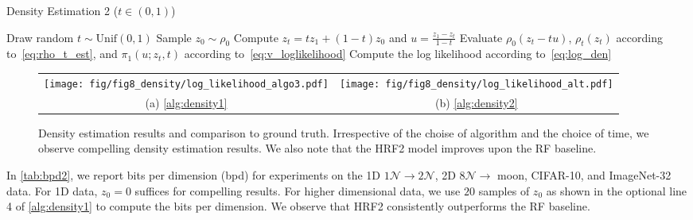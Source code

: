 \begin{algorithm}[t]
\caption{Density Estimation 2 ($t\in(0,1)$)}\label{alg:density2}

Draw random $t \sim \mathrm{Unif}(0, 1)$ \;
Sample  $z_0\sim \rho_0$ \;
Compute $z_t = t z_1 + (1-t) z_0$ and $u = \frac{z_1 - z_t}{1-t}$ \;
Evaluate $\rho_0(z_t - tu)$, $\rho_t(z_t)$ according to~\cref{eq:rho_t_est}, and $\pi_1(u; z_t, t)$ according to~\cref{eq:v_loglikelihood} \;
Compute the log likelihood according to~\cref{eq:log_den} \;
\end{algorithm}

\begin{figure}[t]
    \centering
    \setlength{\tabcolsep}{0pt}
    \begin{tabular}{cc}
    \texttt{[image: fig/fig8\_density/log\_likelihood\_algo3.pdf]}&
    \texttt{[image: fig/fig8\_density/log\_likelihood\_alt.pdf]}\\
    (a) \cref{alg:density1} & (b) \cref{alg:density2} 
    \end{tabular}
    \caption{Density estimation results and comparison to ground truth. Irrespective of the choise of algorithm and the choice of time, we observe compelling density estimation results. We also note that the HRF2 model improves upon the RF baseline.}
    \label{fig:density}
\end{figure}


In \cref{tab:bpd2}, we report bits per dimension (bpd) for experiments on the 1D $1\mathcal{N}\to2\mathcal{N}$, 2D $8\mathcal{N}\to$ moon, CIFAR-10, and ImageNet-32 data.  
For 1D data, $z_0=0$ suffices for compelling results. For higher dimensional data, we use $20$ samples of $z_0$ as shown in the optional line 4 of \cref{alg:density1} to compute the bits per dimension. 
We observe that HRF2 consistently outperforms the RF baseline. 


\begin{table}[t]
\centering
{}
\caption{Density estimation on 1D $1\mathcal{N}\to2\mathcal{N}$, 2D $8\mathcal{N}\to$ moon, CIFAR-10, and ImageNet-32 data using bits per dimension (bpd). We observe a consistently better density estimation with the HRF2 model. }
\label{tab:bpd2}
\end{table}
